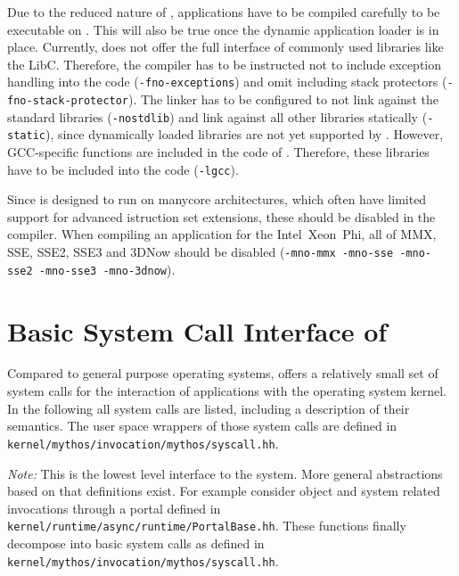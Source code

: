 Due to  the reduced nature of \mythos, applications have to be compiled
carefully to be executable on \mythos. This will also be true once the dynamic
application loader is in place. Currently, \mythos does not offer the full interface
of commonly used libraries like the LibC. Therefore, the compiler has to be
instructed not to include exception handling into the code
(\texttt{-fno-exceptions}) and omit including stack protectors
(\texttt{-fno-stack-protector}). The linker has to be configured to not link
against the standard libraries (\texttt{-nostdlib}) and link against all other
libraries statically (\texttt{-static}), since dynamically loaded libraries are
not yet supported by \mythos. However, GCC-specific functions are included in
the code of \mythos. Therefore, these libraries have to be included into the
code (\texttt{-lgcc}).

Since \mythos is designed to run on manycore architectures, which often have
limited support for advanced istruction set extensions, these should be disabled
in the compiler. When compiling an application for the
Intel\textcopyright~Xeon~Phi\texttrademark{}, all of MMX, SSE, SSE2, SSE3 and
3DNow should be disabled (\texttt{-mno-mmx -mno-sse -mno-sse2 -mno-sse3
-mno-3dnow}).

\section{Basic System Call Interface of \mythos}
\label{sec:system-calls}

Compared to general purpose operating systems, \mythos offers a relatively
small set of system calls for the interaction of applications with the
operating system kernel. In the following all system calls are listed,
including a description of their semantics. The user space wrappers of those
system calls are defined in \texttt{kernel/mythos/invocation/mythos/syscall.hh}.

\noindent \emph{Note:} This is the lowest level interface to the system. More
general abstractions based on that definitions exist. For example consider
object and system related invocations through a portal defined in
\texttt{kernel/runtime/async/runtime/PortalBase.hh}. These functions finally
decompose into basic system calls as defined in
\texttt{\\kernel/mythos/invocation/mythos/syscall.hh}.

